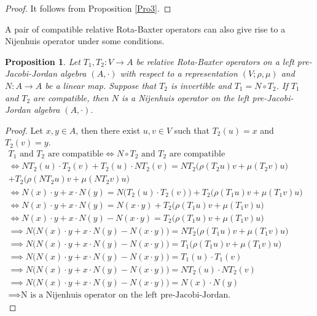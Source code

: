 \documentclass[12pt]{amsart}
\newtheorem{proposition}[Theorem]{Proposition}
\begin{document}
\begin{proof}
	It follows from Proposition \ref{Pro3}.
\end{proof}
A pair of compatible relative Rota-Baxter operators can also give rise to a Nijenhuis operator under some conditions.
\begin{proposition}
	Let  $ T_{1},T_{2} :V\to A $ be relative Rota-Baxter operators on a left pre-Jacobi-Jordan algebra $ (A,\cdot) $ with respect to a representation $ (V;\rho,\mu) $ and $ N: A\to A $ be a linear map.
	Suppose that $ T_{2} $ is invertible and $T_{1}=N\circ T_{2}  $.
	If $ T_{1} $ and $ T_{2} $ are compatible, then $ N $ is a Nijenhuis operator on the left pre-Jacobi-Jordan algebra $ (A,\cdot). $
\end{proposition}
\begin{proof}
	Let $ x,y\in A $, then there exist $ u,v\in V $ such that $ T_{2}(u)=x $ and $ T_{2}(v)=y $.\\
	$ \begin{array}{lll}
		T_{1}  \text{ and } T_{2} \text{ are compatible}\iff N\circ T_{2}  \text{ and } T_{2} \text{ are compatible}\\
		\iff NT_{2}(u)\cdot T_{2}(v)+T_{2}(u)\cdot NT_{2}(v)=NT_{2}\bigg(\rho(T_{2}u)v+\mu(T_{2}v)u\bigg)\\
		+T_{2}\bigg(\rho(NT_{2}u)v+\mu(NT_{2}v)u\bigg)\\
		\iff N(x)\cdot y+x\cdot N(y)=N\bigg(T_{2}(u)\cdot T_{2}(v)\bigg)+T_{2}\bigg(\rho(T_{1}u)v+\mu(T_{1}v)u\bigg)\\
		\iff N(x)\cdot y+x\cdot N(y)=N(x\cdot y)+T_{2}\bigg(\rho(T_{1}u)v+\mu(T_{1}v)u\bigg)\\
		\iff  N(x)\cdot y+x\cdot N(y)-N(x\cdot y)=T_{2}\bigg(\rho(T_{1}u)v+\mu(T_{1}v)u\bigg)\\
		\implies N\bigg( N(x)\cdot y+x\cdot N(y)-N(x\cdot y)\bigg)=NT_{2}\bigg(\rho(T_{1}u)v+\mu(T_{1}v)u\bigg)\\
		\implies N\bigg( N(x)\cdot y+x\cdot N(y)-N(x\cdot y)\bigg)=T_{1}\bigg(\rho(T_{1}u)v+\mu(T_{1}v)u\bigg)\\
		\implies N\bigg( N(x)\cdot y+x\cdot N(y)-N(x\cdot y)\bigg)=T_{1}(u)\cdot T_{1}(v)\\
		\implies N\bigg( N(x)\cdot y+x\cdot N(y)-N(x\cdot y)\bigg)=NT_{2}(u)\cdot NT_{2}(v)\\
		\implies N\bigg( N(x)\cdot y+x\cdot N(y)-N(x\cdot y)\bigg)=N(x)\cdot N(y)\\
		\implies \text{N is a Nijenhuis operator on the left pre-Jacobi-Jordan.}
	\end{array} $ \\
\end{proof}
\end{document}
